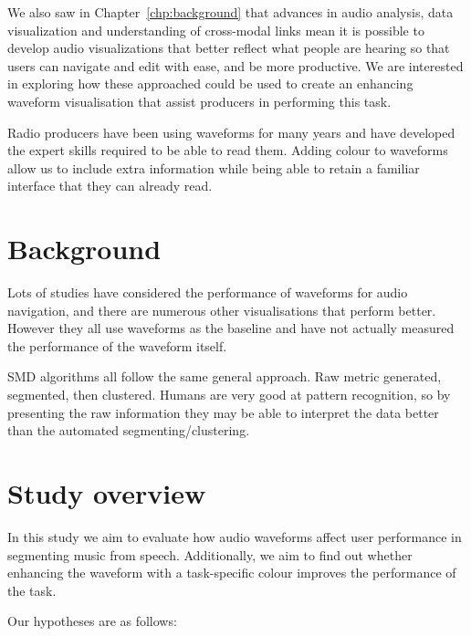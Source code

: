We also saw in Chapter~\ref{chp:background} that advances in audio analysis, data visualization and understanding of
cross-modal links mean it is possible to develop audio visualizations that better reflect what people are hearing so
that users can navigate and edit with ease, and be more productive.
We are interested in exploring how these approached could be used to create an enhancing waveform visualisation that
assist producers in performing this task.

Radio producers have been using waveforms for many years and have developed the expert skills required to be able to
read them.
Adding colour to waveforms allow us to include extra information while being able to retain a familiar interface that
they can already read.

\section{Background}

Lots of studies have considered the performance of waveforms for audio navigation, and there are numerous other
visualisations that perform better.
However they all use waveforms as the baseline and have not actually measured the performance of the waveform itself.

SMD algorithms all follow the same general approach.
Raw metric generated, segmented, then clustered.
Humans are very good at pattern recognition, so by presenting the raw information they may be able to interpret the
data better than the automated segmenting/clustering.

\section{Study overview}

In this study we aim to evaluate how audio waveforms affect user performance in segmenting music from speech.
Additionally, we aim to find out whether enhancing the waveform with a task-specific colour improves the performance of
the task.

Our hypotheses are as follows:

